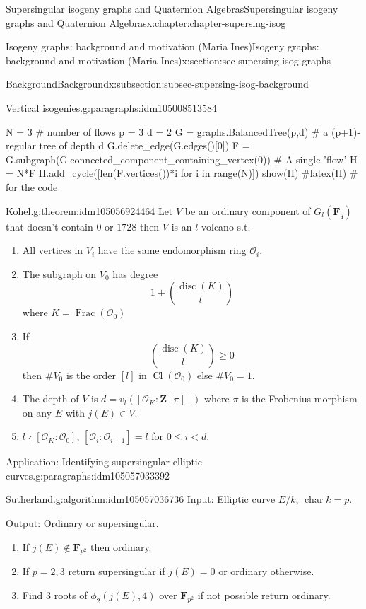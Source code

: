 \documentclass[oneside,10pt,]{book}
\numberwithin{equation}{section}
\newcommand{\lb}{[}
\newcommand{\rb}{]}
\newcommand{\ZZ}{\mathbf{Z}}
\newcommand{\FF}{\mathbf{F}}
\newcommand{\ints}{\mathcal{O}}
\DeclareMathOperator{\Cl}{Cl}
\DeclareMathOperator{\disc}{disc}
\DeclareMathOperator{\characteristic}{char}
\DeclareMathOperator{\Frac}{Frac}
\newcommand{\lt}{<}
\begin{document}
\begin{chapterptx}{Supersingular isogeny graphs and Quaternion Algebras}{}{Supersingular isogeny graphs and Quaternion Algebras}{}{}{x:chapter:chapter-supersing-isog}
\begin{sectionptx}{Isogeny graphs: background and motivation (Maria Ines)}{}{Isogeny graphs: background and motivation (Maria Ines)}{}{}{x:section:sec-supersing-isog-graphs}
\begin{subsectionptx}{Background}{}{Background}{}{}{x:subsection:subsec-supersing-isog-background}
\begin{paragraphs}{Vertical isogenies.}{g:paragraphs:idm105008513584}
\begin{sageinput}
N = 3 # number of flows
p = 3
d = 2
G = graphs.BalancedTree(p,d) # a (p+1)-regular tree of depth d
G.delete_edge(G.edges()[0])
F = G.subgraph(G.connected_component_containing_vertex(0)) # A single 'flow'
H = N*F
H.add_cycle([len(F.vertices())*i for i in range(N)])
show(H)
#latex(H) # for the code
\end{sageinput}
\begin{theorem}{Kohel.}{}{g:theorem:idm105056924464}%
Let \(V\) be an ordinary component of \(G_l(\FF_q)\) that doesn't contain \(0\) or \(1728\) then \(V\) is an \(l\)-volcano s.t.%
\begin{enumerate}
\item{}All vertices in \(V_i\) have the same endomorphism ring \(\ints_i\).%
\item{}The subgraph on \(V_0\) has degree%
\begin{equation*}
1+ \left(\frac {\disc(K)}{l}\right)
\end{equation*}
where \(K = \Frac(\ints_0)\)%
\item{}If%
\begin{equation*}
\left(\frac {\disc(K)}{l}\right) \ge 0
\end{equation*}
then \(\#V_0\) is the order \(\lb l \rb\) in \(\Cl (\ints_0)\) else \(\#V_0 = 1\).%
\item{}The depth of \(V\) is \(d = v_l (\lb \ints_K : \ZZ\lb\pi \rb\rb)\) where \(\pi\) is the Frobenius morphism on any \(E\) with \(j(E) \in V\).%
\item{}\(l \nmid \lb \ints_K : \ints_0 \rb\), \(\lb \ints_i : \ints_{i+1}\rb = l\) for \(0\le i \lt d\).%
\end{enumerate}
%
\end{theorem}
\end{paragraphs}%
\begin{paragraphs}{Application: Identifying supersingular elliptic curves.}{g:paragraphs:idm105057033392}%
\begin{algorithm}{Sutherland.}{}{g:algorithm:idm105057036736}%
Input: Elliptic curve \(E/k\), \(\characteristic k = p\).%
\par
Output: Ordinary or supersingular.%
\par
%
\begin{enumerate}
\item{}If \(j(E) \not \in \FF_{p^2}\) then ordinary.%
\item{}If \(p  =2,3\) return supersingular if \(j(E) = 0\) or ordinary otherwise.%
\item{}Find 3 roots of \(\phi_2(j(E), 4)\) over \(\FF_{p^2}\) if not possible return ordinary.%

\end{enumerate}
\end{algorithm}
\end{paragraphs}
\end{subsectionptx}
\end{sectionptx}
\end{chapterptx}
\end{document}
